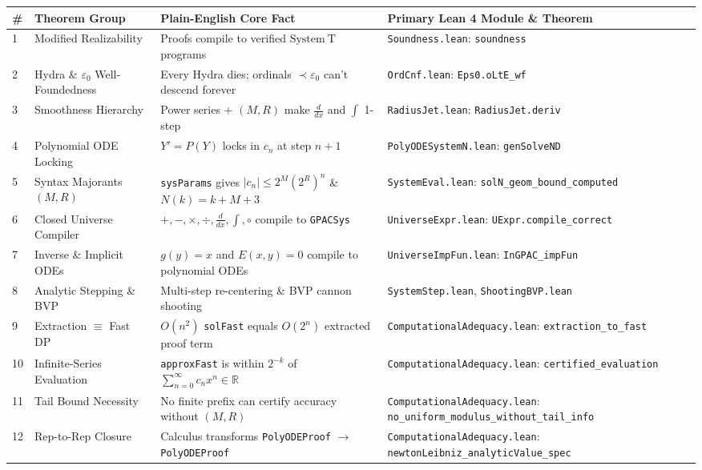 \documentclass[11pt,a4paper]{article}
\newcommand{\SystemT}{\ensuremath{\mathrm{System\ T}}}
\newcommand{\R}{\ensuremath{\mathbb{R}}}
\newcommand{\lean}[1]{\texttt{\nolinkurl{#1}}}
\begin{document}
\begin{center}
\footnotesize
\renewcommand{\arraystretch}{1.15}
\begin{tabular}{@{}p{0.5cm}>{\raggedright\arraybackslash}p{3.9cm}>{\raggedright\arraybackslash}p{4.8cm}>{\raggedright\arraybackslash}p{5.5cm}@{}}
\toprule
\textbf{\#} & \textbf{Theorem Group} & \textbf{Plain-English Core Fact} & \textbf{Primary Lean 4 Module \& Theorem} \\
\midrule
1 & Modified Realizability & Proofs compile to verified \SystemT{} programs & \lean{Soundness.lean}: \lean{soundness} \\
2 & Hydra \& $\varepsilon_0$ Well-Foundedness & Every Hydra dies; ordinals $\prec \varepsilon_0$ can't descend forever & \lean{OrdCnf.lean}: \lean{Eps0.oLtE_wf} \\
3 & Smoothness Hierarchy & Power series + $(M,R)$ make $\frac{d}{dx}$ and $\int$ 1-step & \lean{RadiusJet.lean}: \lean{RadiusJet.deriv} \\
4 & Polynomial ODE Locking & $Y'=P(Y)$ locks in $c_n$ at step $n+1$ & \lean{PolyODESystemN.lean}: \lean{genSolveND} \\
5 & Syntax Majorants $(M,R)$ & \lean{sysParams} gives $|c_n| \le 2^M(2^R)^n$ \& $N(k)=k+M+3$ & \lean{SystemEval.lean}: \lean{solN_geom_bound_computed} \\
6 & Closed Universe Compiler & $+,-,\times,\div,\frac{d}{dx},\int,\circ$ compile to \lean{GPACSys} & \lean{UniverseExpr.lean}: \lean{UExpr.compile_correct} \\
7 & Inverse \& Implicit ODEs & $g(y)=x$ and $E(x,y)=0$ compile to polynomial ODEs & \lean{UniverseImpFun.lean}: \lean{InGPAC_impFun} \\
8 & Analytic Stepping \& BVP & Multi-step re-centering \& BVP cannon shooting & \lean{SystemStep.lean}, \lean{ShootingBVP.lean} \\
9 & Extraction $\equiv$ Fast DP & $O(n^2)$ \lean{solFast} equals $O(2^n)$ extracted proof term & \lean{ComputationalAdequacy.lean}: \lean{extraction_to_fast} \\
10 & Infinite-Series Evaluation & \lean{approxFast} is within $2^{-k}$ of $\sum_{n=0}^\infty c_n x^n \in \R$ & \lean{ComputationalAdequacy.lean}: \lean{certified_evaluation} \\
11 & Tail Bound Necessity & No finite prefix can certify accuracy without $(M,R)$ & \lean{ComputationalAdequacy.lean}: \lean{no_uniform_modulus_without_tail_info} \\
12 & Rep-to-Rep Closure & Calculus transforms \lean{PolyODEProof} $\to$ \lean{PolyODEProof} & \lean{ComputationalAdequacy.lean}: \lean{newtonLeibniz_analyticValue_spec} \\

\end{tabular}
\end{center}
\end{document}

